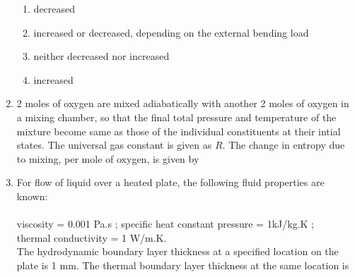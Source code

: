 \documentclass[journal,12pt,onecolumn]{IEEEtran}
\begin{document}
\begin{enumerate}
          \begin{enumerate}
              \item decreased
              \item increased or decreased, depending on the external bending load
              \item neither decreased nor increased
              \item increased
          \end{enumerate}

    \item 2 moles of oxygen are mixed adiabatically with another 2 moles of oxygen in a mixing chamber, so that the final total pressure and temperature of the mixture become same as those of the individual constituents at their intial states. The universal gas constant is given as $R$. The change in entropy due to mixing, per mole of oxygen, is given by\\

          \begin{enumerate}
          \end{enumerate}

    \item For flow of liquid over a heated plate, the following fluid properties are known:\\\\
          viscosity = 0.001 Pa.s ; specific heat constant pressure = 1kJ/kg.K ;\\
          thermal conductivity = 1 W/m.K.\\
          The hydrodynamic boundary layer thickness at a specified location on the plate is 1 mm. The thermal boundary layer thickness at the same location is

          \begin{enumerate}
          \end{enumerate}


\end{enumerate}
\end{document}
